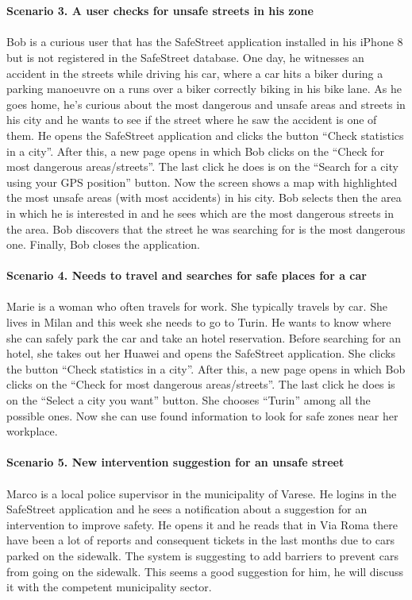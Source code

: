 \documentclass[a4paper]{report}
\begin{document}
\\
\\
\textbf{Scenario 3. A user checks for unsafe streets in his zone}\\
\\
Bob is a curious user that has the SafeStreet application installed in his iPhone 8 but is not registered in the SafeStreet database. One day, he witnesses an accident in the streets while driving his car, where a car hits a biker during a parking manoeuvre on a runs over a biker correctly biking in his bike lane.
As he goes home, he’s curious about the most dangerous and unsafe areas and streets in his city and he wants to see if the street where he saw the accident is one of them. He opens the SafeStreet application and clicks the button “Check statistics in a city”. After this, a new page opens in which Bob clicks on the “Check for most dangerous areas/streets”. The last click he does is on the “Search for a city using your GPS position” button. Now the screen shows a map with highlighted the most unsafe areas (with most accidents) in his city. Bob selects then the area in which he is interested in and he sees which are the most dangerous streets in the area. Bob discovers that the street he was searching for is the most dangerous one. Finally, Bob closes the application.
\\
\\
\textbf{Scenario 4. Needs to travel and searches for safe places for a car}\\
\\
Marie is a woman who often travels for work. She typically travels by car. She lives in Milan and this week she needs to go to Turin. He wants to know where she can safely park the car and take an hotel reservation. Before searching for an hotel, she takes out her Huawei and opens the SafeStreet application. She clicks the button “Check statistics in a city”. After this, a new page opens in which Bob clicks on the “Check for most dangerous areas/streets”. The last click he does is on the “Select a city you want” button. She chooses “Turin” among all the possible ones. Now she can use found information to look for safe zones near her workplace.
\\ 
\\
\textbf{Scenario 5. New intervention suggestion for an unsafe street}\\
\\
Marco is a local police supervisor in the municipality of Varese. He logins in the SafeStreet application and he sees a notification about a suggestion for an intervention to improve safety. He opens it and he reads that in Via Roma there have been a lot of reports and consequent tickets in the last months due to cars parked on the sidewalk. The system is suggesting to add barriers to prevent cars from going on the sidewalk. This seems a good suggestion for him, he will discuss it with the competent municipality sector. 
\end{document}
